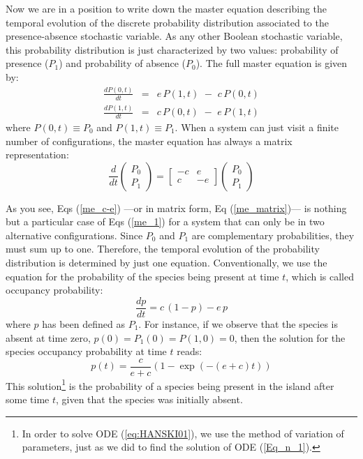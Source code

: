 Now we are in a position to write down the master equation describing the temporal evolution of the discrete probability distribution associated to the presence-absence stochastic variable. As any other Boolean stochastic variable, this probability distribution is just characterized by two values: probability of presence ($P_1$) and probability of absence ($P_0$). The full master equation is given by:
\begin{eqnarray}
\frac{dP(0,t)}{dt} &=&    e\, P(1,t) \,\, - \,\, c\, P(0,t)  \nonumber \\
\frac{dP(1,t)}{dt} &=&    c\, P(0,t) \,\, - \,\, e\, P(1,t)  
\label{me_c-e}
\end{eqnarray}
where $P(0,t) \equiv P_0$ and $P(1,t) \equiv P_1$. When a system can just visit a finite number of configurations, the master equation has always a matrix representation: 
\begin{equation}
\label{me_matrix}
\frac{d}{dt}\left(
\begin{array}{c}
P_0 \\ 
P_1 
\end{array}
\right) = \left[\begin{array}{cc}
-c &  e \\
 c & -e 
 \end{array} 
\right]
\left(
\begin{array}{c}
P_0 \\ 
P_1 
\end{array}
\right)
\end{equation}

As you see, Eqs (\ref{me_c-e}) ---or in matrix form, Eq (\ref{me_matrix})--- is nothing but a particular case of Eqs (\ref{me_1}) for a system that can only be in two alternative configurations. Since $P_0$ and $P_1$ are complementary probabilities, they must sum up to one. Therefore, the temporal evolution of the probability distribution is determined by just one equation. Conventionally, we use the equation for the probability of the species being present at time $t$, which is called occupancy probability:
\begin{equation}
\frac{dp}{dt} = c\,(1-p) - e\,p
\label{eq:HANSKI01}
\end{equation}
where $p$ has been defined as $P_1$. For instance, if we observe that the species is absent at time zero, $p(0) = P_1(0) = P(1,0) = 0$, then the solution for the species occupancy probability at time $t$ reads:
\begin{equation}
\label{t_10}
p(t) = \frac{c}{e+c} ( 1 - \exp(-(e+c)t ))
\end{equation}
This solution\footnote{In order to solve ODE (\ref{eq:HANSKI01}), we use the method of variation of parameters, just as we did to find the solution of ODE (\ref{Eq_n_1}).} is the probability of a species being present in the island after some time $t$, given that the species was initially absent. 
\smallskip

